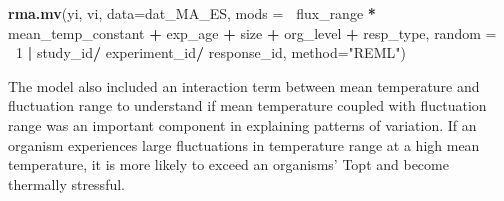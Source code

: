 \documentclass[12pt,twoside]{reedthesis}
\newenvironment{Shaded}{\begin{snugshade}}{\end{snugshade}}
\newcommand{\DataTypeTok}[1]{\textcolor[rgb]{0.13,0.29,0.53}{#1}}
\newcommand{\DecValTok}[1]{\textcolor[rgb]{0.00,0.00,0.81}{#1}}
\newcommand{\KeywordTok}[1]{\textcolor[rgb]{0.13,0.29,0.53}{\textbf{#1}}}
\newcommand{\NormalTok}[1]{#1}
\newcommand{\OperatorTok}[1]{\textcolor[rgb]{0.81,0.36,0.00}{\textbf{#1}}}
\newcommand{\StringTok}[1]{\textcolor[rgb]{0.31,0.60,0.02}{#1}}
\begin{document}
\begin{Shaded}
\begin{Highlighting}[]
\KeywordTok{rma.mv}\NormalTok{(yi, vi, }\DataTypeTok{data=}\NormalTok{dat_MA_ES, }\DataTypeTok{mods =} \OperatorTok{~}\NormalTok{flux_range }\OperatorTok{*}\StringTok{ }\NormalTok{mean_temp_constant }
       \OperatorTok{+}\StringTok{ }\NormalTok{exp_age }\OperatorTok{+}\StringTok{ }\NormalTok{size }\OperatorTok{+}\StringTok{ }\NormalTok{org_level }\OperatorTok{+}\StringTok{ }\NormalTok{resp_type, }
               \DataTypeTok{random =} \OperatorTok{~}\DecValTok{1} \OperatorTok{|}\StringTok{  }\NormalTok{study_id}\OperatorTok{/}\StringTok{ }\NormalTok{experiment_id}\OperatorTok{/}\StringTok{ }\NormalTok{response_id,}
                 \DataTypeTok{method=}\StringTok{"REML"}\NormalTok{) }
\end{Highlighting}
\end{Shaded}
The model also included an interaction term between mean temperature and fluctuation range to understand if mean temperature coupled with fluctuation range was an important component in explaining patterns of variation. If an organism experiences large fluctuations in temperature range at a high mean temperature, it is more likely to exceed an organisms' Topt and become thermally stressful.
\end{document}
